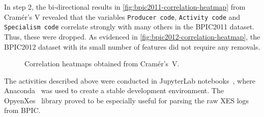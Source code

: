 In step 2, the bi-directional results in \autoref{fig:bpic2011-correlation-heatmap} from Cramér's V revealed that the variables \texttt{Producer code}, \texttt{Activity code} and \texttt{Specialism code} correlate strongly with many others in the BPIC2011 dataset. Thus, these were dropped. As evidenced in \autoref{fig:bpic2012-correlation-heatmap}, the BPIC2012 dataset with its small number of features did not require any removals.

\begin{figure}
\centering
{}
\qquad
{}
\caption{Correlation heatmaps obtained from Cramér's~V.}
\end{figure}

The activities described above were conducted in JupyterLab notebooks~\cite{web:jupyter}, where Anaconda~\cite{web:anaconda} was used to create a stable development environment. The OpyenXes~\cite{web:opyenxes} library proved to be especially useful for parsing the raw XES logs from BPIC.


